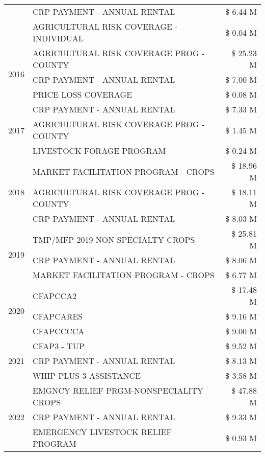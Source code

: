 \begin{tabular}{llr}
 & CRP PAYMENT - ANNUAL RENTAL & \$ 6.44 M \\
 & AGRICULTURAL RISK COVERAGE - INDIVIDUAL & \$ 0.04 M \\
\cline{1-3}
\multirow[t]{3}{*}{2016} & AGRICULTURAL RISK COVERAGE PROG - COUNTY & \$ 25.23 M \\
 & CRP PAYMENT - ANNUAL RENTAL & \$ 7.00 M \\
 & PRICE LOSS COVERAGE & \$ 0.08 M \\
\cline{1-3}
\multirow[t]{3}{*}{2017} & CRP PAYMENT - ANNUAL RENTAL & \$ 7.33 M \\
 & AGRICULTURAL RISK COVERAGE PROG - COUNTY & \$ 1.45 M \\
 & LIVESTOCK FORAGE PROGRAM & \$ 0.24 M \\
\cline{1-3}
\multirow[t]{3}{*}{2018} & MARKET FACILITATION PROGRAM - CROPS & \$ 18.96 M \\
 & AGRICULTURAL RISK COVERAGE PROG - COUNTY & \$ 18.11 M \\
 & CRP PAYMENT - ANNUAL RENTAL & \$ 8.03 M \\
\cline{1-3}
\multirow[t]{3}{*}{2019} & TMP/MFP 2019 NON SPECIALTY CROPS & \$ 25.81 M \\
 & CRP PAYMENT - ANNUAL RENTAL & \$ 8.06 M \\
 & MARKET FACILITATION PROGRAM - CROPS & \$ 6.77 M \\
\cline{1-3}
\multirow[t]{3}{*}{2020} & CFAPCCA2 & \$ 17.48 M \\
 & CFAPCARES & \$ 9.16 M \\
 & CFAPCCCCA & \$ 9.00 M \\
\cline{1-3}
\multirow[t]{3}{*}{2021} & CFAP3 - TUP & \$ 9.52 M \\
 & CRP PAYMENT - ANNUAL RENTAL & \$ 8.13 M \\
 & WHIP PLUS 3 ASSISTANCE & \$ 3.58 M \\
\cline{1-3}
\multirow[t]{3}{*}{2022} & EMGNCY RELIEF PRGM-NONSPECIALITY CROPS & \$ 47.88 M \\
 & CRP PAYMENT - ANNUAL RENTAL & \$ 9.33 M \\
 & EMERGENCY LIVESTOCK RELIEF PROGRAM & \$ 0.93 M \\
\cline{1-3}
\bottomrule
\end{tabular}
